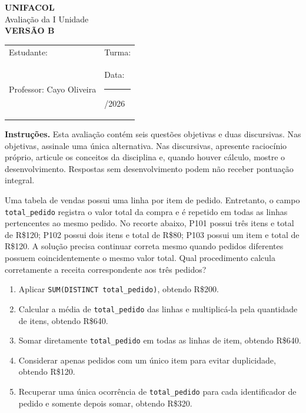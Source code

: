 \documentclass[12pt,a4paper]{article}
\begin{document}
\begin{center}
{\Large\bfseries UNIFACOL}\\[2mm]
{\large Avaliação da I Unidade}\\[1mm]
{\Large\bfseries VERSÃO B}
\end{center}

\begin{DocumentBox}[Identificação]
\begin{tabularx}{\textwidth}{@{}p{}p{}@{}}
Estudante: \hrulefill & Turma: \hrulefill\\[3mm]
Professor: Cayo Oliveira & Data: \rule{2.7cm}{.2pt}/2026
\end{tabularx}
\end{DocumentBox}

\textbf{Instruções.} Esta avaliação contém seis questões objetivas e duas discursivas. Nas objetivas, assinale uma única alternativa. Nas discursivas, apresente raciocínio próprio, articule os conceitos da disciplina e, quando houver cálculo, mostre o desenvolvimento. Respostas sem desenvolvimento podem não receber pontuação integral.

\TextoBase
Uma tabela de vendas possui uma linha por item de pedido. Entretanto, o campo \texttt{total\_pedido} registra o valor total da compra e é repetido em todas as linhas pertencentes ao mesmo pedido. No recorte abaixo, P101 possui três itens e total de R\$120; P102 possui dois itens e total de R\$80; P103 possui um item e total de R\$120. A solução precisa continuar correta mesmo quando pedidos diferentes possuem coincidentemente o mesmo valor total.
\FonteDidatica
\Comando Qual procedimento calcula corretamente a receita correspondente aos três pedidos?
\begin{enumerate}[label=\Alph*)]
\item Aplicar \texttt{SUM(DISTINCT total\_pedido)}, obtendo R\$200.
\item Calcular a média de \texttt{total\_pedido} das linhas e multiplicá-la pela quantidade de itens, obtendo R\$640.
\item Somar diretamente \texttt{total\_pedido} em todas as linhas de item, obtendo R\$640.
\item Considerar apenas pedidos com um único item para evitar duplicidade, obtendo R\$120.
\item Recuperar uma única ocorrência de \texttt{total\_pedido} para cada identificador de pedido e somente depois somar, obtendo R\$320.
\end{enumerate}
\end{document}
